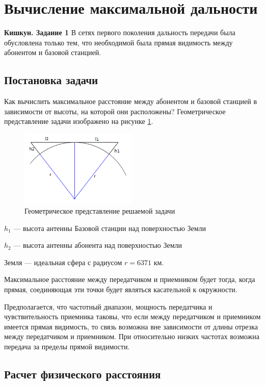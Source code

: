 \section{Вычисление максимальной дальности}
\textbf{Кишкун. Задание 1}
В сетях первого поколения дальность передачи была обусловлена только
тем, что необходимой была прямая видимость между абонентом
и базовой станцией.
\subsection{Постановка задачи}
Как вычислить максимальное расстояние между абонентом и базовой станцией в зависимости от высоты, на которой они расположены? Геометрическое представление задачи изображено на рисунке \ref{fig:img8}.

\begin{figure}[H]
	\centering
	\includegraphics[width=0.5\textwidth]{img/kich_bur/image8.png}
	\caption{Геометрическое представление решаемой задачи}
	\label{fig:img8}
\end{figure}

$ h_1 $ --- высота антенны Базовой станции над поверхностью Земли 

$ h_2 $ --- высота антенны абонента над поверхностью Земли 

Земля --- идеальная сфера с радиусом $r = 6371$ км.

Максимальное расстояние между передатчиком и приемником будет тогда, когда прямая, соединяющая эти точки будет являться касательной к окружности. 

Предполагается, что частотный диапазон, мощность передатчика и чувствительность
приемника таковы, что если между передатчиком и приемником имеется
прямая видимость, то связь возможна вне зависимости от длины отрезка
между передатчиком и приемником. При относительно низких частотах
возможна передача за пределы прямой видимости. 

\subsection{Расчет физического расстояния}

